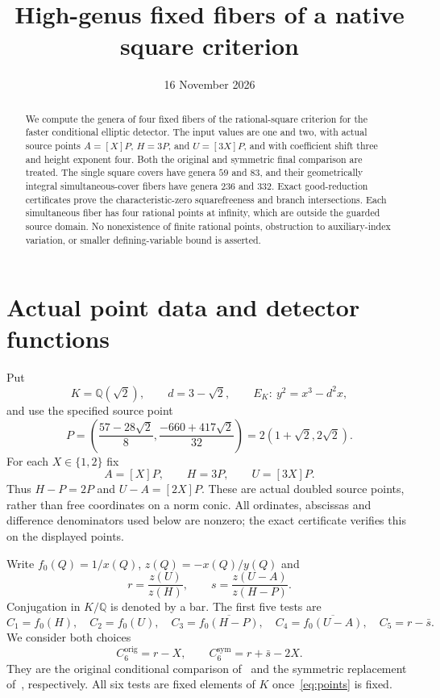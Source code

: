 \documentclass[11pt,a4paper]{article}
\title{High-genus fixed fibers of a native square criterion}
\author{}\date{16 November 2026}
\newcommand{\Q}{\mathbb Q}
\begin{document}
\maketitle
\begin{abstract}
We compute the genera of four fixed fibers of the rational-square
criterion for the faster conditional elliptic detector. The input
values are one and two, with actual source points
$A=[X]P$, $H=3P$, and $U=[3X]P$, and with coefficient shift three
and height exponent four. Both the original and symmetric final
comparison are treated. The single square covers have genera $59$
and $83$, and their geometrically integral simultaneous-cover fibers
have genera $236$ and $332$. Exact good-reduction certificates prove
the characteristic-zero squarefreeness and branch intersections.
Each simultaneous fiber has four rational points at infinity, which
are outside the guarded source domain. No nonexistence of finite
rational points, obstruction to auxiliary-index variation, or smaller
defining-variable bound is asserted.
\end{abstract}

\section{Actual point data and detector functions}
Put
\[
 K=\Q(\sqrt2),\qquad d=3-\sqrt2,\qquad
 E_K:\ y^2=x^3-d^2x,
\]
and use the specified source point
\[
 P=\left(\frac{57-28\sqrt2}{8},
          \frac{-660+417\sqrt2}{32}\right)
   =2(1+\sqrt2,2\sqrt2).
\]
For each $X\in\{1,2\}$ fix
\begin{equation}\label{eq:points}
                  A=[X]P,\qquad H=3P,\qquad U=[3X]P.
\end{equation}
Thus $H-P=2P$ and $U-A=[2X]P$. These are actual doubled source
points, rather than free coordinates on a norm conic. All ordinates,
abscissas and difference denominators used below are nonzero; the
exact certificate verifies this on the displayed points.

Write $f_0(Q)=1/x(Q)$, $z(Q)=-x(Q)/y(Q)$ and
\[
 r=\frac{z(U)}{z(H)},\qquad
 s=\frac{z(U-A)}{z(H-P)}.
\]
Conjugation in $K/\Q$ is denoted by a bar. The first five tests are
\[
 C_1=f_0(H),\quad C_2=f_0(U),\quad
 C_3=\overline{f_0(H-P)},\quad C_4=\overline{f_0(U-A)},
 \quad C_5=r-\bar s.
\]
We consider both choices
\begin{equation}\label{eq:last}
       C_6^{\mathrm{orig}}=r-X,
       \qquad C_6^{\mathrm{sym}}=r+\bar s-2X.
\end{equation}
They are the original conditional comparison of~\cite{Direct} and
the symmetric replacement of~\cite{Criterion}, respectively.
All six tests are fixed elements of $K$ once~\eqref{eq:points} is
fixed.
\end{document}
